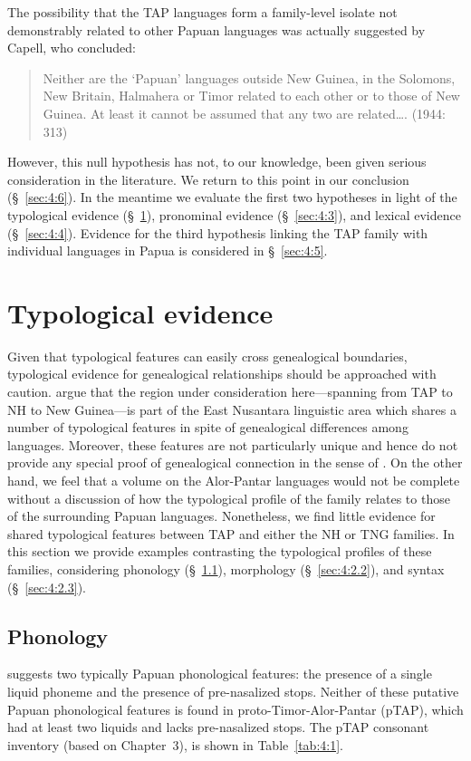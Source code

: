 The possibility that the TAP languages form a family-level isolate not demonstrably related to other Papuan languages was actually suggested by Capell, who concluded:

\begin{quote}
Neither are the `Papuan' languages outside New Guinea, in the Solomons, New Britain, Halmahera or Timor related to each other or to those of New Guinea. At least it cannot be assumed that any two are related{\dots}. (1944: 313)
\end{quote}

However, this null hypothesis has not, to our knowledge, been given serious consideration in the literature. We return to this point in our conclusion ({\S}~\ref{sec:4:6}). In the meantime we evaluate the first two hypotheses in light of the typological evidence ({\S}~\ref{sec:4:2}), pronominal evidence ({\S}~\ref{sec:4:3}), and lexical evidence ({\S}~\ref{sec:4:4}). Evidence for the third hypothesis linking the TAP family with individual languages in Papua is considered in {\S}~\ref{sec:4:5}.

\section{Typological evidence}\label{sec:4:2}
Given that typological features can easily cross genealogical boundaries, typological evidence for genealogical relationships should be approached with caution. \citet{KlamerEtAl2008} argue that the region under consideration here---spanning from TAP to NH to New Guinea---is part of the East Nusantara linguistic area which shares a number of typological features in spite of genealogical differences among languages. Moreover, these features are not particularly unique and hence do not provide any special proof of genealogical connection in the sense of \citet{Meillet1967}. On the other hand, we feel that a volume on the Alor-Pantar languages would not be complete without a discussion of how the typological profile of the family relates to those of the surrounding Papuan languages. Nonetheless, we find little evidence for shared typological features between TAP and either the NH or TNG families. In this section we provide examples contrasting the typological profiles of these families, considering phonology ({\S}~\ref{sec:4:2.1}), morphology ({\S}~\ref{sec:4:2.2}), and syntax ({\S}~\ref{sec:4:2.3}).

\subsection{Phonology}\label{sec:4:2.1}
\citet{Foley1998} suggests two typically Papuan phonological features: the presence of a single liquid phoneme and the presence of pre-nasalized stops. Neither of these putative Papuan phonological features is found in proto-Timor-Alor-Pantar (pTAP), which had at least two liquids and lacks pre-nasalized stops. The pTAP consonant inventory (based on Chapter~3), is shown in Table~\ref{tab:4:1}.


